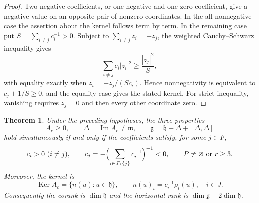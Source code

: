 \documentclass[12pt]{amsart}
\theoremstyle{plain}
\newtheorem{theorem}{Theorem}[section]
\theoremstyle{definition}
\theoremstyle{remark}
\newcommand{\alg}[1]{\mathfrak{#1}}
\newcommand{\Ker}{\operatorname{Ker}}
\newcommand{\imd}{\operatorname{Im}}
\begin{document}
\begin{proof}
Two negative coefficients, or one negative and one zero coefficient, give a negative value on an
opposite pair of nonzero coordinates. In the all-nonnegative case the assertion about the kernel
follows term by term. In the remaining case put $S=\sum_{i\neq j}c_i^{-1}>0$. Subject to
$\sum_{i\neq j}z_i=-z_j$, the weighted Cauchy--Schwarz inequality gives
\[ \sum_{i\neq j}c_i|z_i|^2\ge\frac{|z_j|^2}{S}, \]
with equality exactly when $z_i=-z_j/(Sc_i)$. Hence nonnegativity is equivalent to
$c_j+1/S\ge0$, and the equality case gives the stated kernel. For strict inequality, vanishing
requires $z_j=0$ and then every other coordinate zero.
\end{proof}

\begin{theorem}\label{thm:criterion}
Under the preceding hypotheses, the three properties
\[ A_c\ge0,\qquad \Delta=\imd A_c\neq\alg{m},\qquad \alg{g}=\alg{h}+\Delta+[\Delta,\Delta] \]
hold simultaneously if and only if the coefficients satisfy, for some $j\in F$,
\begin{equation}\label{eq:criterion}
c_i>0\ (i\neq j),\qquad c_j=-\Bigl(\sum_{i\in J\setminus\{j\}}c_i^{-1}\Bigr)^{-1}<0,\qquad
P\neq\varnothing\ \text{or}\ r\ge3.
\end{equation}
Moreover, the kernel is
\begin{equation}\label{eq:kernel}
\Ker A_c=\{n(u):u\in\alg{h}\},\qquad
n(u)_i=c_i^{-1}\rho_i(u),\quad i\in J.
\end{equation}
Consequently the corank is $\dim\alg{h}$ and the horizontal rank is
$\dim\alg{g}-2\dim\alg{h}$.
\end{theorem}
\end{document}
